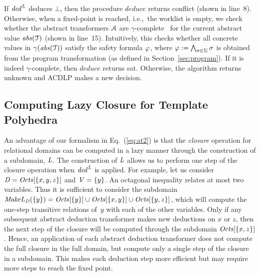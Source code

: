 If $\mathit{ded}^{\mathit{L}}$ deduces $\bot$, then 
the procedure $\mathit{deduce}$ returns \textsf{conflict} (shown in line~8).
Otherwise, when a fixed-point is reached, i.e.,~the worklist is empty, we check whether
the abstract transformers $\mathcal{A}$ are $\gamma$-complete~\cite{dhk2013-popl} for the current abstract value $\mathit{abs}(\mathcal{T})$ 
(shown in line~15).
%
Intuitively, this checks whether all concrete values in 
$\gamma(\mathit{abs}(\mathcal{T}))$ satisfy the safety formula $\varphi$, where 
$\varphi:= \bigwedge_{\sigma\in\Sigma} \sigma$ is obtained 
from the program transformation (as defined in Section~\ref{sec:program}).
%
If it is indeed 
$\gamma$-complete, then $\mathit{deduce}$ returns \textsf{sat}.  Otherwise, the 
algorithm returns \textsf{unknown} and ACDLP makes a new decision.    
%
\subsection{Computing Lazy Closure for Template Polyhedra}\label{lazyclosure}
%
An advantage of our formalism in Eq.~(\ref{eq:at2}) is that the 
\emph{closure} operation for relational domains can be computed 
in a lazy manner through the construction of a subdomain, $\mathit{L}$.  
The construction of $\mathit{L}$ allows us to perform one step of the 
closure operation when $\mathit{ded}^{\mathit{L}}$ is applied.
%
For example, let us consider $\mathit{D}=\mathit{Octs}[\{x,y,z\}]$ and
$\mathit{V}=\{y\}$. An octagonal inequality relates at 
most two variables. Thus it is sufficient to consider the subdomain
$\mathit{MakeL}_{\mathit{D}}(\{y\})=\mathit{Octs}[\{y\}]\cup\mathit{Octs}[\{x,y\}]\cup\mathit{Octs}[\{y,z\}]$,
which will compute the one-step transitive relations of~$y$ with each
of the other variables. 
%
Only if any subsequent abstract deduction transformer makes new deductions 
on $x$ or $z$, then the next step of the closure will be computed through 
the subdomain $\mathit{Octs}[\{x,z\}]$.
Hence, an application of each abstract deduction transformer does not 
compute the full closure in the full domain, but compute only a single 
step of the closure in a subdomain. This makes each deduction step more 
efficient but may require more steps to reach the fixed point.  

%
